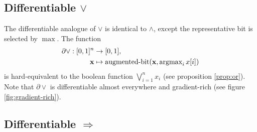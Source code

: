 \documentclass{article} %
\begin{document}
\subsection{Differentiable $\vee$}

The differentiable analogue of $\vee$ is identical to $\wedge$, except the representative bit is selected by $\operatorname{max}$. The function
\begin{equation*}
\begin{aligned}
\partial\vee: [0,1]^{n} &\to [0,1], \\
{\bf x} &\mapsto \operatorname{augmented-bit}({\bf x}, \operatorname{argmax}\limits_{i} x[i])
\end{aligned}
\end{equation*}
is hard-equivalent to the boolean function $\bigvee_{i=1}^{n} x_i$ (see proposition \ref{prop:or}). Note that $\partial \vee$ is differentiable almost everywhere and gradient-rich (see figure \ref{fig:gradient-rich}).

\subsection{Differentiable $\Rightarrow$}
\end{document}
